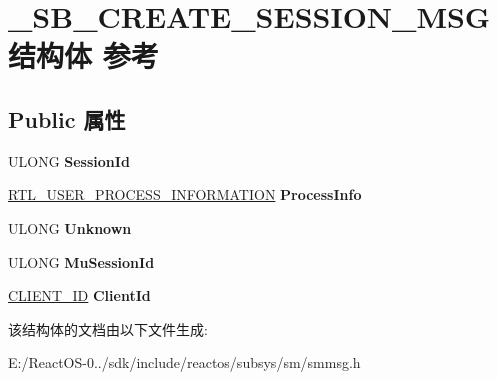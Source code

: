 \hypertarget{struct___s_b___c_r_e_a_t_e___s_e_s_s_i_o_n___m_s_g}{}\section{\+\_\+\+S\+B\+\_\+\+C\+R\+E\+A\+T\+E\+\_\+\+S\+E\+S\+S\+I\+O\+N\+\_\+\+M\+S\+G结构体 参考}
\label{struct___s_b___c_r_e_a_t_e___s_e_s_s_i_o_n___m_s_g}
\subsection*{Public 属性}
\begin{DoxyCompactItemize}
\item 
\mbox{\label{struct___s_b___c_r_e_a_t_e___s_e_s_s_i_o_n___m_s_g_aaece4f410c8775df3b20ac25ddd80489}} 
U\+L\+O\+NG {\bfseries Session\+Id}
\item 
\mbox{\label{struct___s_b___c_r_e_a_t_e___s_e_s_s_i_o_n___m_s_g_ac9c62267f1624968c411fec94e7bbc2c}} 
\hyperlink{struct___r_t_l___u_s_e_r___p_r_o_c_e_s_s___i_n_f_o_r_m_a_t_i_o_n}{R\+T\+L\+\_\+\+U\+S\+E\+R\+\_\+\+P\+R\+O\+C\+E\+S\+S\+\_\+\+I\+N\+F\+O\+R\+M\+A\+T\+I\+ON} {\bfseries Process\+Info}
\item 
\mbox{\label{struct___s_b___c_r_e_a_t_e___s_e_s_s_i_o_n___m_s_g_a57a486a51b9046d634b8402d69606bc2}} 
U\+L\+O\+NG {\bfseries Unknown}
\item 
\mbox{\label{struct___s_b___c_r_e_a_t_e___s_e_s_s_i_o_n___m_s_g_a6fd672aa022563258fd43afc858a427a}} 
U\+L\+O\+NG {\bfseries Mu\+Session\+Id}
\item 
\mbox{\label{struct___s_b___c_r_e_a_t_e___s_e_s_s_i_o_n___m_s_g_a8e7108efeaa75626e7d7cfdf05fc02e6}} 
\hyperlink{struct___c_l_i_e_n_t___i_d}{C\+L\+I\+E\+N\+T\+\_\+\+ID} {\bfseries Client\+Id}
\end{DoxyCompactItemize}


该结构体的文档由以下文件生成\+:\begin{DoxyCompactItemize}
\item 
E\+:/\+React\+O\+S-\/0../sdk/include/reactos/subsys/sm/smmsg.\+h\end{DoxyCompactItemize}
